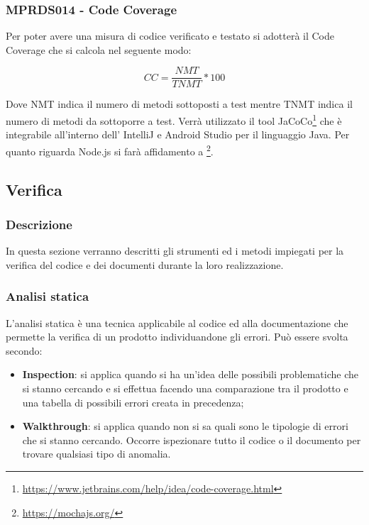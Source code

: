 \subsubsection{MPRDS014 - Code Coverage}
\label{sec:CodeCoverage}
Per poter avere una misura di codice verificato e testato si adotterà il Code Coverage che si calcola nel seguente modo:
\begin{center}
	\begin{displaymath}
	CC = \frac{NMT}{TNMT} * 100
	\end{displaymath}
\end{center}
Dove NMT indica il numero di metodi sottoposti a test mentre TNMT indica il numero di metodi da sottoporre a test.
Verrà utilizzato il tool JaCoCo\footnote{\href{https://www.jetbrains.com/help/idea/code-coverage.html}{https://www.jetbrains.com/help/idea/code-coverage.html}} che è integrabile all'interno dell' IntelliJ  e Android Studio per il linguaggio Java. Per quanto riguarda Node.js si farà affidamento a \footnote{\href{https://mochajs.org/}{https://mochajs.org/}}.

\subsection{Verifica}
\label{sec:verifica}
\subsubsection{Descrizione}
In questa sezione verranno descritti gli strumenti ed i metodi impiegati per la verifica del codice e dei documenti durante la loro realizzazione.
\subsubsection{Analisi statica}
L’analisi statica è una tecnica applicabile al codice ed alla documentazione che permette la verifica di un prodotto individuandone gli errori. Può essere svolta secondo:
\begin{itemize}
    \item \textbf{Inspection}: si applica quando si ha un’idea delle possibili problematiche che si stanno cercando e si effettua facendo una comparazione tra il prodotto e una tabella di possibili errori creata in precedenza;
    \item \textbf{Walkthrough}: si applica quando non si sa quali sono le tipologie di errori che si stanno cercando. Occorre ispezionare tutto il codice o il documento per trovare qualsiasi tipo di anomalia.
\end{itemize}
